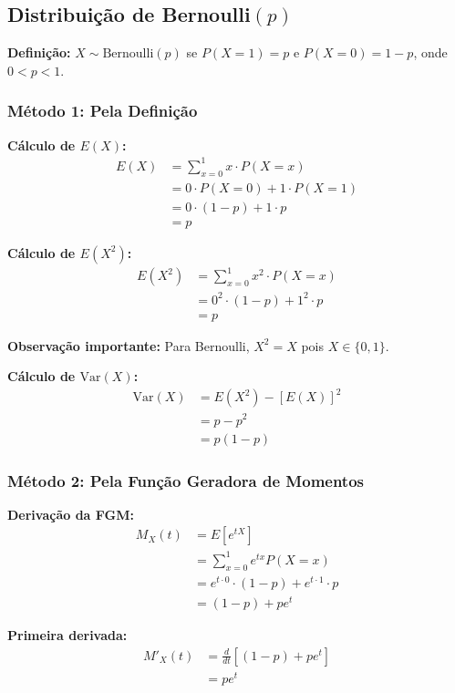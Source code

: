 \documentclass[12pt,a4paper]{article}
\theoremstyle{plain}
\theoremstyle{definition}
\theoremstyle{remark}
\begin{document}
\subsection{Distribuição de Bernoulli\((p)\)}

\textbf{Definição:} \(X \sim \text{Bernoulli}(p)\) se \(P(X = 1) = p\) e \(P(X = 0) = 1-p\), onde \(0 < p < 1\).

\subsubsection{Método 1: Pela Definição}

\textbf{Cálculo de \(E(X)\):}
\begin{align}
E(X) &= \sum_{x=0}^{1} x \cdot P(X = x) \\
&= 0 \cdot P(X = 0) + 1 \cdot P(X = 1) \\
&= 0 \cdot (1-p) + 1 \cdot p \\
&= p
\end{align}

\textbf{Cálculo de \(E(X^2)\):}
\begin{align}
E(X^2) &= \sum_{x=0}^{1} x^2 \cdot P(X = x) \\
&= 0^2 \cdot (1-p) + 1^2 \cdot p \\
&= p
\end{align}

\textbf{Observação importante:} Para Bernoulli, \(X^2 = X\) pois \(X \in \{0,1\}\).

\textbf{Cálculo de \(\text{Var}(X)\):}
\begin{align}
\text{Var}(X) &= E(X^2) - [E(X)]^2 \\
&= p - p^2 \\
&= p(1-p)
\end{align}

\subsubsection{Método 2: Pela Função Geradora de Momentos}

\textbf{Derivação da FGM:}
\begin{align}
M_X(t) &= E[e^{tX}] \\
&= \sum_{x=0}^{1} e^{tx} P(X = x) \\
&= e^{t \cdot 0} \cdot (1-p) + e^{t \cdot 1} \cdot p \\
&= (1-p) + p e^t
\end{align}

\textbf{Primeira derivada:}
\begin{align}
M'_X(t) &= \frac{d}{dt}[(1-p) + p e^t] \\
&= p e^t
\end{align}
\end{document}
